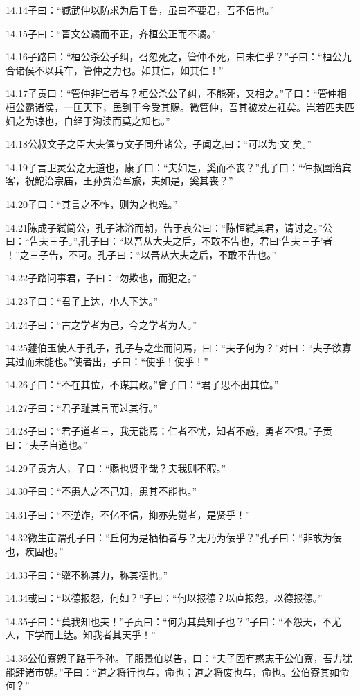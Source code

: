 \documentclass[a4paper,12pt,UTF8,twoside]{ctexbook}
\begin{document}
14.14子曰：“臧武仲以防求为后于鲁，虽曰不要君，吾不信也。”

14.15子曰：“晋文公谲而不正，齐桓公正而不谲。”

14.16子路曰：“桓公杀公子纠，召忽死之，管仲不死，曰未仁乎？”子曰：“桓公九合诸侯不以兵车，管仲之力也。如其仁，如其仁！”

14.17子贡曰：“管仲非仁者与？桓公杀公子纠，不能死，又相之。”子曰：“管仲相桓公霸诸侯，一匡天下，民到于今受其赐。微管仲，吾其被发左衽矣。岂若匹夫匹妇之为谅也，自经于沟渎而莫之知也。”

14.18公叔文子之臣大夫僎与文子同升诸公，子闻之,曰：“可以为‘文’矣。”

14.19子言卫灵公之无道也，康子曰：“夫如是，奚而不丧？”孔子曰：“仲叔圉治宾客，祝鮀治宗庙，王孙贾治军旅，夫如是，奚其丧？”

14.20子曰：“其言之不怍，则为之也难。”

14.21陈成子弑简公，孔子沐浴而朝，告于哀公曰：“陈恒弑其君，请讨之。”公曰：“告夫三子。”,孔子曰：“以吾从大夫之后，不敢不告也，君曰‘告夫三子’者
！”之三子告，不可。孔子曰：“以吾从大夫之后，不敢不告也。”

14.22子路问事君，子曰：“勿欺也，而犯之。”

14.23子曰：“君子上达，小人下达。”

14.24子曰：“古之学者为己，今之学者为人。”

14.25蘧伯玉使人于孔子，孔子与之坐而问焉，曰：“夫子何为？”对曰：“夫子欲寡其过而未能也。”使者出，子曰：“使乎！使乎！”

14.26子曰：“不在其位，不谋其政。”曾子曰：“君子思不出其位。”

14.27子曰：“君子耻其言而过其行。”

14.28子曰：“君子道者三，我无能焉：仁者不忧，知者不惑，勇者不惧。”子贡曰：“夫子自道也。”

14.29子贡方人，子曰：“赐也贤乎哉？夫我则不暇。”

14.30子曰：“不患人之不己知，患其不能也。”

14.31子曰：“不逆诈，不亿不信，抑亦先觉者，是贤乎！”

14.32微生亩谓孔子曰：“丘何为是栖栖者与？无乃为佞乎？”孔子曰：“非敢为佞也，疾固也。”

14.33子曰：“骥不称其力，称其德也。”

14.34或曰：“以德报怨，何如？”子曰：“何以报德？以直报怨，以德报德。”

14.35子曰：“莫我知也夫！”子贡曰：“何为其莫知子也？”子曰：“不怨天，不尤人，下学而上达。知我者其天乎！”

14.36公伯寮愬子路于季孙。子服景伯以告，曰：“夫子固有惑志于公伯寮，吾力犹能肆诸市朝。”子曰：“道之将行也与，命也；道之将废也与，命也。公伯寮其如命何？”
\end{document}
